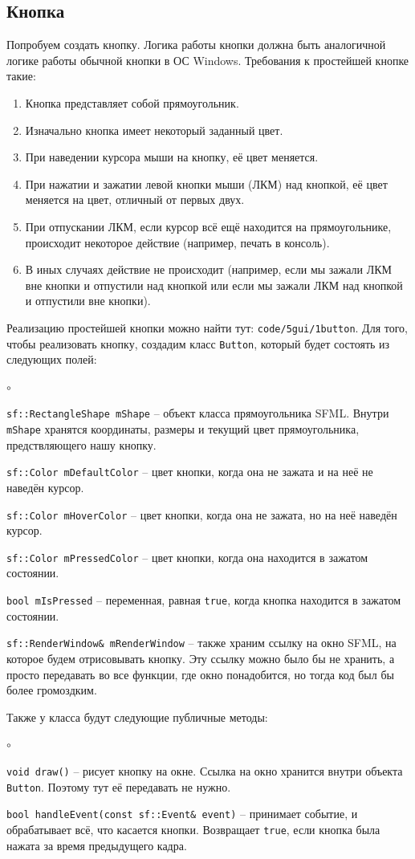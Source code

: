 \documentclass{article}
\begin{document}
\subsection*{Кнопка}
Попробуем создать кнопку. Логика работы кнопки должна быть аналогичной логике работы обычной кнопки в ОС Windows. Требования к простейшей кнопке такие:
\begin{enumerate}
\item Кнопка представляет собой прямоугольник.
\item Изначально кнопка имеет некоторый заданный цвет.
\item При наведении курсора мыши на кнопку, её цвет меняется.
\item При нажатии и зажатии левой кнопки мыши (ЛКМ) над кнопкой, её цвет меняется на цвет, отличный от первых двух.
\item При отпускании ЛКМ, если курсор всё ещё находится на прямоугольнике, происходит некоторое действие (например, печать в консоль).
\item В иных случаях действие не происходит (например, если мы зажали ЛКМ вне кнопки и отпустили над кнопкой или если мы зажали ЛКМ над кнопкой и отпустили вне кнопки).
\end{enumerate}
Реализацию простейшей кнопки можно найти тут: \texttt{code/5gui/1button}.
Для того, чтобы реализовать кнопку, создадим класс \texttt{Button}, который будет состоять из следующих полей:
\begin{list}{$\circ$}{}  
\item \texttt{sf::RectangleShape mShape} -- объект класса прямоугольника SFML. Внутри \texttt{mShape} хранятся координаты, размеры и текущий цвет прямоугольника, предствляющего нашу кнопку.
\item \texttt{sf::Color mDefaultColor} -- цвет кнопки, когда она не зажата и на неё не наведён курсор.
\item \texttt{sf::Color mHoverColor} -- цвет кнопки, когда она не зажата, но на неё наведён курсор.
\item \texttt{sf::Color mPressedColor} -- цвет кнопки, когда она находится в зажатом состоянии.
\item \texttt{bool mIsPressed} -- переменная, равная \texttt{true}, когда кнопка находится в зажатом состоянии.
\item \texttt{sf::RenderWindow\& mRenderWindow} -- также храним ссылку на окно SFML, на которое будем отрисовывать кнопку. Эту ссылку можно было бы не хранить, а просто передавать во все функции, где окно понадобится, но тогда код был бы более громоздким.
\end{list}
Также у класса будут следующие публичные методы:
\begin{list}{$\circ$}{}  
\item \texttt{void draw()} -- рисует кнопку на окне. Ссылка на окно хранится внутри объекта \texttt{Button}. Поэтому тут её передавать не нужно.
\item \texttt{bool handleEvent(const sf::Event\& event)} -- принимает событие, и обрабатывает всё, что касается кнопки. Возвращает \texttt{true}, если кнопка была нажата за время предыдущего кадра.
\end{list}
\quad 
\end{document}
